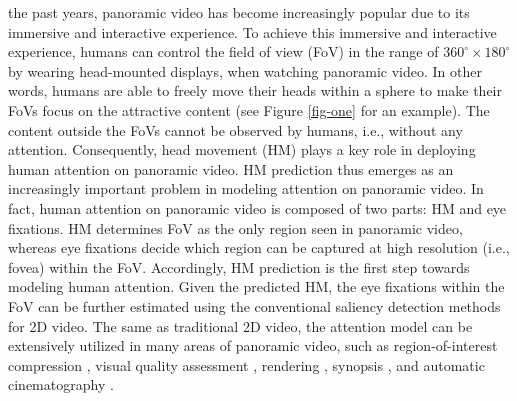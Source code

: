 \documentclass[10pt,journal,compsoc]{IEEEtran}
\begin{document}
%
%
%
%
 the past years, panoramic video \cite{neumann2000immersive} has become increasingly popular due to its immersive and interactive experience.
To achieve this immersive and interactive experience, humans can control the field of view (FoV)  in the range of $360^{\circ} \times 180^{\circ}$ by wearing head-mounted displays, when watching panoramic video.
In other words, humans are able to freely move their heads within a sphere to make their FoVs focus on the attractive content (see Figure \ref{fig-one} for an example).
The content outside the FoVs cannot be observed by humans, i.e., without any attention.
Consequently, head movement (HM) plays a key role in deploying human attention on panoramic video.
HM prediction thus emerges as an increasingly important problem in modeling attention on panoramic video.
In fact, human attention on panoramic video is composed of two parts: HM and eye fixations. HM determines FoV as the only region seen in panoramic video, whereas eye fixations decide which region can be captured at high resolution (i.e., fovea) within the FoV. Accordingly, HM prediction is the first step towards modeling human attention. Given the predicted HM, the eye fixations within the FoV can be further estimated using the conventional saliency detection methods \cite{borji2013state} for 2D video.
The same as traditional 2D video, the attention model can be extensively utilized in many areas of panoramic video, such as region-of-interest compression \cite{de2016video}, visual quality assessment \cite{gaddam2016tiling, Xu17}, rendering \cite{stengel2016gaze}, synopsis \cite{Pritch08}, and automatic cinematography \cite{su2016pano2vid}.
\end{document}
